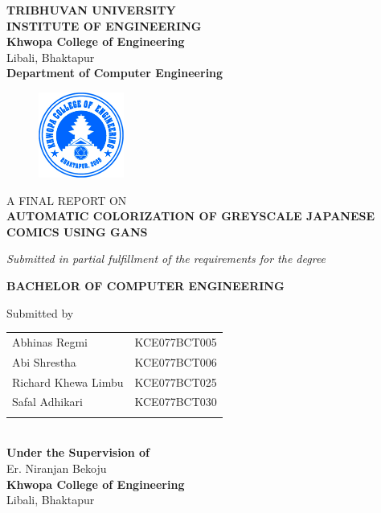 	\begin{center}
		\thispagestyle{empty}
		\Large\textbf{TRIBHUVAN UNIVERSITY}\\
		\Large\textbf{INSTITUTE OF ENGINEERING }\\
		\vspace{0.4in}
		\large{\textbf{Khwopa College of Engineering}\\}
		\normalsize{Libali, Bhaktapur\\}
		\large\textbf{Department of Computer Engineering}
		\vspace{0.3in}
		\begin{figure}[h]
		    \centering
			    \includegraphics[width=0.25\textwidth]{img/Khwopalogo.jpg}
		\end{figure}
		
		\vspace{0.4in}
		\large{A FINAL REPORT ON\\\textbf{\MakeUppercase{Automatic Colorization of Greyscale Japanese Comics using GANs}}\\}
		
		\vspace{0.3in}
		\large{\textit{Submitted in partial fulfillment of the requirements for the degree\\}}
		
		\vspace{0.3in}
		\large{\textbf{BACHELOR OF COMPUTER ENGINEERING}\\}
		
		\vspace{0.4in}
		\large{Submitted by}\\
		\begin{tabular}{p{3.5in}p{3in}}
			\hspace{0.3cm}Abhinas Regmi & KCE077BCT005\\
			\hspace{0.3cm}Abi Shrestha & KCE077BCT006\\
			\hspace{0.3cm}Richard Khewa Limbu & KCE077BCT025\\
			\hspace{0.3cm}Safal Adhikari & KCE077BCT030\\
		 \vspace{0.3in}
		\end{tabular}
		\\
		\large{\textbf{Under the Supervision of}}\\
			\normalsize{Er. Niranjan Bekoju}\\ 

		\vspace{1cm}
		\large{\textbf{Khwopa College of Engineering}\\}
			\normalsize{Libali, Bhaktapur}
	\end{center}
